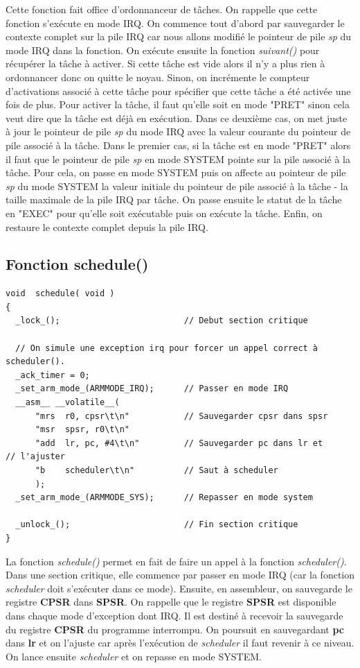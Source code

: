 \documentclass[a4paper,12pt]{report}
\begin{document}
Cette fonction fait office d'ordonnanceur de tâches. On rappelle que cette fonction s'exécute en mode IRQ. On commence tout d'abord par sauvegarder le contexte complet sur la pile IRQ car nous allons modifié le pointeur de pile \textit{sp} du mode IRQ dans la fonction. On exécute ensuite la fonction \textit{suivant()} pour récupérer la tâche à activer. Si cette tâche est vide alors il n'y a plus rien à ordonnancer donc on quitte le noyau. Sinon, on incrémente le compteur d'activations associé à cette tâche pour spécifier que cette tâche a été activée une fois de plus. Pour activer la tâche, il faut qu'elle soit en mode "PRET" sinon cela veut dire que la tâche est déjà en exécution. Dans ce deuxième cas, on met juste à jour le pointeur de pile \textit{sp} du mode IRQ avec la valeur courante du pointeur de pile associé à la tâche. Dans le premier cas, si la tâche est en mode "PRET" alors il faut que le pointeur de pile \textit{sp} en mode SYSTEM pointe sur la pile associé à la tâche. Pour cela, on passe en mode SYSTEM puis on affecte au pointeur de pile \textit{sp} du mode SYSTEM la valeur initiale du pointeur de pile associé à la tâche - la taille maximale de la pile IRQ par tâche. On passe ensuite le statut de la tâche en "EXEC" pour qu'elle soit exécutable puis on exécute la tâche. Enfin, on restaure le contexte complet depuis la pile IRQ.



\subsection{Fonction schedule()}
\begin{lstlisting}
void  schedule( void )
{
  _lock_();                         // Debut section critique  

  // On simule une exception irq pour forcer un appel correct à scheduler(). 
  _ack_timer = 0;
  _set_arm_mode_(ARMMODE_IRQ);      // Passer en mode IRQ  
  __asm__ __volatile__(
      "mrs  r0, cpsr\t\n"           // Sauvegarder cpsr dans spsr  
      "msr  spsr, r0\t\n"
      "add  lr, pc, #4\t\n"         // Sauvegarder pc dans lr et 																		// l'ajuster  
      "b    scheduler\t\n"          // Saut à scheduler  
      );
  _set_arm_mode_(ARMMODE_SYS);      // Repasser en mode system  

  _unlock_();                       // Fin section critique  
}
\end{lstlisting}
La fonction \textit{schedule()} permet en fait de faire un appel à la fonction \textit{scheduler()}. Dans une section critique, elle commence par passer en mode IRQ (car la fonction \textit{scheduler} doit s'exécuter dans ce mode). Ensuite, en assembleur, on sauvegarde le registre \textbf{CPSR} dans \textbf{SPSR}. On rappelle que le registre \textbf{SPSR} est disponible dans chaque mode d'exception dont IRQ. Il est destiné à recevoir la sauvegarde du registre \textbf{CPSR} du programme interrompu. On poursuit en sauvegardant \textbf{pc} dans \textbf{lr} et on l'ajuste car après l'exécution de \textit{scheduler} il faut revenir à ce niveau. On lance ensuite \textit{scheduler} et on repasse en mode SYSTEM.
\end{document}
